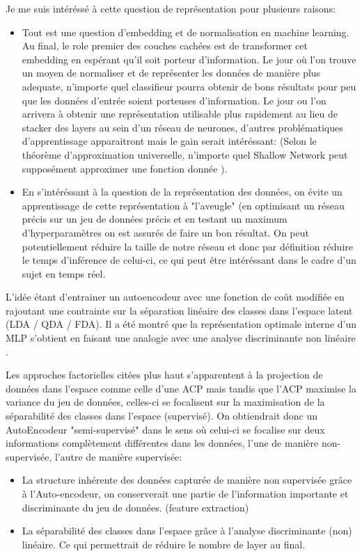 Je me suis intéréssé à cette question de représentation pour plusieurs raisons:
\begin{itemize}
    \item Tout est une question d'embedding et de normalisation en machine learning. Au final, le role premier des couches cachées est de transformer cet embedding en espérant qu'il soit porteur d'information. Le jour où l'on trouve un moyen de normaliser et de représenter les données de manière plus adequate, n'importe quel classifieur pourra obtenir de bons résultats pour peu que les données d'entrée soient porteuses d'information. Le jour ou l'on arrivera à obtenir une représentation utilisable plus rapidement au lieu de stacker des layers au sein d'un réseau de neurones, d'autres problématiques d'apprentissage apparaitront mais le gain serait intéréssant: (Selon le théorème d'approximation universelle, n'importe quel Shallow Network peut supposément approximer une fonction donnée \cite{universalapproxtheorm,scarselli1998universal}).
    
    \item En s'intéréssant à la question de la représentation des données, on évite un apprentissage de cette représentation à "l'aveugle" (en optimisant un réseau précis sur un jeu de données précis et en testant un maximum d'hyperparamètres on est assurés de faire un bon résultat.  On peut potentiellement réduire la taille de notre réseau et donc par définition réduire le temps d'inférence de celui-ci, ce qui peut être intéréssant dans le cadre d'un sujet en temps réel.
\end{itemize}

L'idée étant d'entrainer un autoencodeur avec une fonction de coût modifiée en rajoutant une contrainte sur la séparation linéaire des classes dans l'espace latent (LDA / QDA / FDA). Il a été montré que la représentation optimale interne d'un MLP s'obtient en faisant une analogie avec une analyse discriminante non linéaire \cite{webb1990optimised}.

Les approches factorielles citées plus haut s'apparentent à la projection de données dans l'espace comme celle d'une ACP mais tandis que l'ACP maximise la variance du jeu de données, celles-ci se focalisent sur la maximisation de la séparabilité des classes dans l'espace (supervisé). On obtiendrait donc un AutoEncodeur "semi-supervisé" dans le sens où celui-ci se focalise sur deux informations complètement différentes dans les données, l'une de manière non-supervisée, l'autre de manière supervisée:
\begin{itemize}
    \item La structure inhérente des données capturée de manière non supervisée grâce à l'Auto-encodeur, on conserverait une partie de l'information importante et discriminante du jeu de données. (feature extraction)
    \item La séparabilité des classes dans l'espace grâce à l'analyse discriminante (non) linéaire. Ce qui permettrait de réduire le nombre de layer au final.
\end{itemize}{}


